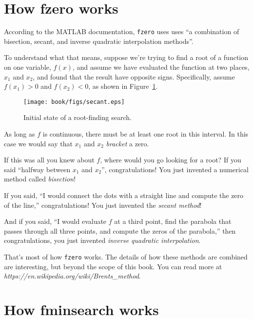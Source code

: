 

\section{How fzero works}
\label{howfzero}

According to the MATLAB documentation, {\tt fzero} uses uses ``a combination of bisection, secant, and inverse quadratic interpolation methods''.


To understand what that means, suppose we're trying to find a root of a function on one variable, $f(x)$, and assume we have evaluated the function at two places, $x_1$ and $x_2$, and found that the result have opposite signs.  Specifically, assume $f(x_1) > 0$ and $f(x_2) < 0$, as shown in Figure~\ref{fig:secant}.

\begin{figure}[ht]
\centerline{\texttt{[image: book/figs/secant.eps]}}
\caption{Initial state of a root-finding search.}
\label{fig:secant}
\end{figure}

As long as $f$ is continuous, there must be at least one root in this interval.  
In this case we would say that $x_1$ and $x_2$ \emph{bracket} a zero.


If this was all you knew about $f$, where would you go looking for
a root?  If you said ``halfway between $x_1$ and $x_2$'',
congratulations!  You just invented a numerical method called
\emph{bisection}!

If you said, ``I would connect the dots with a straight line
and compute the zero of the line,''
congratulations!  You just invented the \emph{secant method}!

And if you said, ``I would evaluate $f$ at a third point, find the
parabola that passes through all three points, and compute the zeros
of the parabola,'' then congratulations, you just invented 
\emph{inverse quadratic interpolation}.

That's most of how {\tt fzero} works.  The details of how these methods are combined are interesting, but beyond the scope of this book.  You can read more at \emph{https://en.wikipedia.org/wiki/Brents\_method}.  


\section{How fminsearch works}
\label{howfminsearch}

